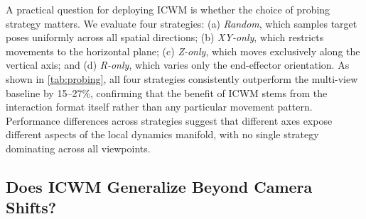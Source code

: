\begin{table}
\centering
\small
\vspace{-5mm}
\caption{Success rates (\%) under different probing strategies on OOD viewpoints.}
\label{tab:probing}
\vspace{-10pt}
\end{table}
A practical question for deploying ICWM is whether the choice of probing strategy matters. 
We evaluate four strategies: (a) \textit{Random}, which samples target poses uniformly across all spatial directions; 
(b) \textit{XY-only}, which restricts movements to the horizontal plane; (c)
\textit{Z-only}, which moves exclusively along the vertical axis; and (d) \textit{R-only}, which varies only the end-effector orientation.
As shown in \autoref{tab:probing}, all four strategies consistently outperform the multi-view baseline by 15–27\%, confirming that the benefit of ICWM stems from the interaction format itself rather than any particular movement pattern. 
Performance differences across strategies suggest that different axes expose different aspects of the local dynamics manifold, with no single strategy dominating across all viewpoints.




\subsection{Does ICWM Generalize Beyond Camera Shifts?}



